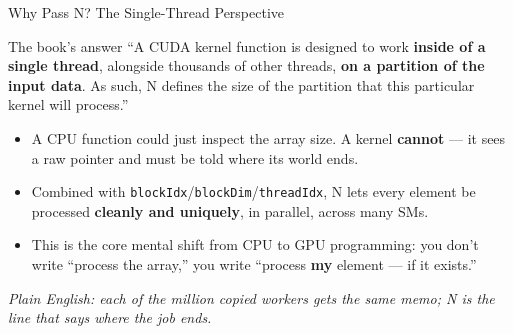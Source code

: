 \documentclass[aspectratio=169]{beamer}
\newcommand{\kw}[1]{\textbf{\textcolor{kwblue}{#1}}}
\newcommand{\pe}[1]{{\footnotesize\itshape Plain English: #1}}
\begin{document}
\begin{frame}{Why Pass N? The Single-Thread Perspective}
  \begin{block}{The book's answer}
    ``A CUDA kernel function is designed to work \kw{inside of a single thread}, alongside thousands
    of other threads, \kw{on a partition of the input data}. As such, N defines the size of the
    partition that this particular kernel will process.''
  \end{block}
  \begin{itemize}
    \item A CPU function could just inspect the array size. A kernel \kw{cannot} ---
          it sees a raw pointer and must be told where its world ends.
    \item Combined with \texttt{blockIdx}/\texttt{blockDim}/\texttt{threadIdx}, N lets every
          element be processed \kw{cleanly and uniquely}, in parallel, across many SMs.
    \item This is the core mental shift from CPU to GPU programming: you don't write
          ``process the array,'' you write ``process \kw{my} element --- if it exists.''
  \end{itemize}
  \medskip
  \pe{each of the million copied workers gets the same memo; N is the line that says where the job ends.}
\end{frame}
\end{document}

